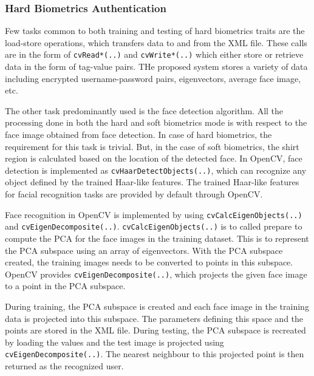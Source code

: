 \documentclass[12pt]{article}			%
\begin{document}
\subsubsection{ Hard Biometrics Authentication }

Few tasks common to both training and testing of hard biometrics traits are the load-store operations, which transfers data to and from the XML file.
These calls are in the form of \verb+cvRead*(..)+ and \verb+cvWrite*(..)+ which either store or retrieve data in the form of tag-value pairs.
THe proposed system stores a variety of data including encrypted username-password pairs, eigenvectors, average face image, etc. 

The other task predominantly used is the face detection algorithm.
All the processing done in both the hard and soft biometrics mode is with respect to the face image obtained from face detection.
In case of hard biometrics, the requirement for this task is trivial.
But, in the case of soft biometrics, the shirt region is calculated based on the location of the detected face.
In OpenCV, face detection is implemented as \verb+cvHaarDetectObjects(..)+, which can recognize any object defined by the trained Haar-like features.
The trained Haar-like features for facial recognition tasks are provided by default through OpenCV.

Face recognition in OpenCV is implemented by using \verb+cvCalcEigenObjects(..)+ and \verb+cvEigenDecomposite(..)+. 
\verb+cvCalcEigenObjects(..)+ is to called prepare to compute the PCA for the face images in the training dataset.
This is to represent the PCA subspace using an array of eigenvectors.
With the PCA subspace created, the training images needs to be converted to points in this subspace.
OpenCV provides \verb+cvEigenDecomposite(..)+, which projects the given face image to a point in the PCA subspace.

During training, the PCA subspace is created and each face image in the training data is projected into this subspace.
The parameters defining this space and the points are stored in the XML file.
During testing, the PCA subspace is recreated by loading the values and the test image is projected using \verb+cvEigenDecomposite(..)+.
The nearest neighbour to this projected point is then returned as the recognized user.
\end{document}
